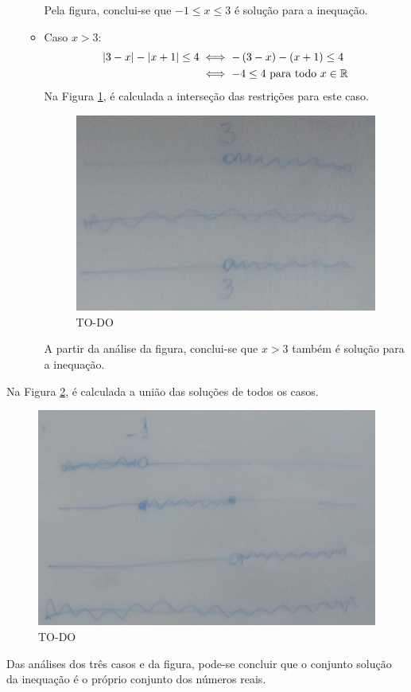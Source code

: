 \begin{solution}
\begin{enumerate}[(a)]
\begin{itemize}
\begin{figure}[H]
		\centering
		\end{figure}
		Pela figura, conclui-se que $-1 \le x \le 3$ é solução para a inequação.
		\item Caso $x > 3$:
		\begin{align*}
		\left|3-x\right| - \left|x+1\right| \le 4 & \iff -\left(3-x\right)-\left(x+1\right) \le 4 \\
		& \iff -4\le 4 \text{ para todo }x \in \mathbb{R}
		\end{align*}
		Na Figura \ref{fig:08-28-cut3}, é calculada a interseção das restrições para este caso.
		\begin{figure}[H]
		\caption{TO-DO}
		\label{fig:08-28-cut3} 
		\includegraphics[scale=0.3]{../../res/img/cut3.jpg}
		\centering
		\end{figure}
		A partir da análise da figura, conclui-se que $x>3$ também é solução para a inequação.
	\end{itemize}
\end{enumerate}
%
Na Figura \ref{fig:08-28-cut4}, é calculada a união das soluções de todos os casos.
%
\begin{figure}[H]
\caption{TO-DO}
\label{fig:08-28-cut4} 
\includegraphics[scale=0.3]{../../res/img/cut4.jpg}
\centering
\end{figure}
%
Das análises dos três casos e da figura, pode-se concluir que o conjunto solução da inequação é o próprio conjunto dos números reais.
\end{solution}
